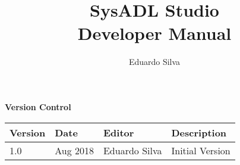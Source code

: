 \documentclass[]{report}
\title{SysADL Studio\\\small{Developer Manual}}
\author{Eduardo Silva}
\begin{document}
\maketitle

\begin{table*}
	\centering
	{\huge{\textbf{Version Control}}}\\
	\vspace{15px}
	\begin{tabular}{l | l | l | l}
		\hline
		\textbf{Version} & \textbf{Date} & \textbf{Editor} & \textbf{Description} \\ \hline
		1.0 & Aug 2018 & Eduardo Silva & Initial Version \\
		\hline
	\end{tabular}
\end{table*}

\tableofcontents







\end{document}

